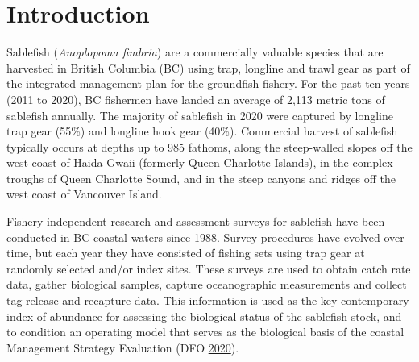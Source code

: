 \documentclass[12pt]{article}\usepackage[]{graphicx}\usepackage[]{color}
\begin{document}

\frontmatter


\renewcommand{\headrulewidth}{0.5pt}  %
\renewcommand{\footrulewidth}{0.5pt}  %

\hypertarget{introduction}{%
\section{Introduction}\label{introduction}}

Sablefish (\emph{Anoplopoma fimbria}) are a commercially valuable species that are harvested in British Columbia (BC) using trap, longline and trawl gear as part of the integrated management plan for the groundfish fishery. For the past ten years (2011 to 2020), BC fishermen have landed an average of 2,113 metric tons of sablefish annually. The majority of sablefish in 2020 were captured by longline trap gear (55\%) and longline hook gear (40\%). Commercial harvest of sablefish typically occurs at depths up to 985 fathoms, along the steep-walled slopes off the west coast of Haida Gwaii (formerly Queen Charlotte Islands), in the complex troughs of Queen Charlotte Sound, and in the steep canyons and ridges off the west coast of Vancouver Island.

Fishery-independent research and assessment surveys for sablefish have been conducted in BC coastal waters since 1988. Survey procedures have evolved over time, but each year they have consisted of fishing sets using trap gear at randomly selected and/or index sites. These surveys are used to obtain catch rate data, gather biological samples, capture oceanographic measurements and collect tag release and recapture data. This information is used as the key contemporary index of abundance for assessing the biological status of the sablefish stock, and to condition an operating model that serves as the biological basis of the coastal Management Strategy Evaluation (DFO \protect\hyperlink{ref-DFO2020}{2020}).
\end{document}

